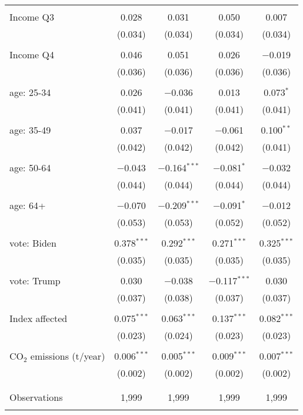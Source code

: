 \begin{tabular}{@{\extracolsep{5pt}}lcccc}
  & & & & \\ 
 Income Q3 & 0.028 & 0.031 & 0.050 & 0.007 \\ 
  & (0.034) & (0.034) & (0.034) & (0.034) \\ 
  & & & & \\ 
 Income Q4 & 0.046 & 0.051 & 0.026 & $-$0.019 \\ 
  & (0.036) & (0.036) & (0.036) & (0.036) \\ 
  & & & & \\ 
 age: 25-34 & 0.026 & $-$0.036 & 0.013 & 0.073$^{*}$ \\ 
  & (0.041) & (0.041) & (0.041) & (0.041) \\ 
  & & & & \\ 
 age: 35-49 & 0.037 & $-$0.017 & $-$0.061 & 0.100$^{**}$ \\ 
  & (0.042) & (0.042) & (0.042) & (0.041) \\ 
  & & & & \\ 
 age: 50-64 & $-$0.043 & $-$0.164$^{***}$ & $-$0.081$^{*}$ & $-$0.032 \\ 
  & (0.044) & (0.044) & (0.044) & (0.044) \\ 
  & & & & \\ 
 age: 64+ & $-$0.070 & $-$0.209$^{***}$ & $-$0.091$^{*}$ & $-$0.012 \\ 
  & (0.053) & (0.053) & (0.052) & (0.052) \\ 
  & & & & \\ 
 vote: Biden & 0.378$^{***}$ & 0.292$^{***}$ & 0.271$^{***}$ & 0.325$^{***}$ \\ 
  & (0.035) & (0.035) & (0.035) & (0.035) \\ 
  & & & & \\ 
 vote: Trump & 0.030 & $-$0.038 & $-$0.117$^{***}$ & 0.030 \\ 
  & (0.037) & (0.038) & (0.037) & (0.037) \\ 
  & & & & \\ 
 Index affected & 0.075$^{***}$ & 0.063$^{***}$ & 0.137$^{***}$ & 0.082$^{***}$ \\ 
  & (0.023) & (0.024) & (0.023) & (0.023) \\ 
  & & & & \\ 
 CO$_{2}$ emissions (t/year) & 0.006$^{***}$ & 0.005$^{***}$ & 0.009$^{***}$ & 0.007$^{***}$ \\ 
  & (0.002) & (0.002) & (0.002) & (0.002) \\ 
  & & & & \\ 
\hline \\[-1.8ex] 

Observations & 1,999 & 1,999 & 1,999 & 1,999 \\ 
\hline 
\hline \\[-1.8ex] 
\end{tabular} 